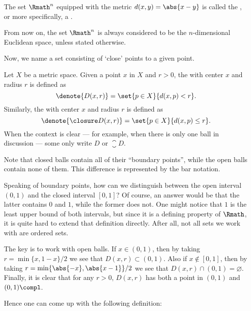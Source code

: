 \begin{definition}
    \label{def:eucspace}
    The set \(\Rmath^n\) equipped with the metric \(d(x,y)=\abs{x-y}\)
    is called the ,
    or more specifically,
    a .
    
    From now on,
    the set \(\Rmath^n\) is always considered to be
    the \(n\)-dimensional Euclidean space,
    unless stated otherwise.
\end{definition}

Now, we name a set consisting of `close' points to a given point.

\begin{definition}[Balls]
    \label{def:ball}
    Let \(X\) be a metric space.
    Given a point \(x\) in \(X\) and \(r>0\),
    the  with center \(x\) and radius \(r\)
    is defined as
    \[
        \denote{D(x,r)}
        =\set{p\in X}{d(x,p)<r}.
    \]
    Similarly,
    the 
    with center \(x\) and radius \(r\)
    is defined as
    \[
        \denote{\closure D(x,r)}
        =\set{p\in X}{d(x,p)\le r}.
    \]
    When the context is clear
    ---
    for example, when there is only one ball in discussion
    ---
    some only write \(D\) or \(\closure D\).
\end{definition}

Note that closed balls contain all of their ``boundary points'',
while the open balls contain none of them.
This difference is represented by the bar notation.

Speaking of boundary points,
how can we distinguish between the open interval \((0,1)\)
and the closed interval \([0,1]\)?
Of course, an answer would be that
the latter contains \(0\) and \(1\),
while the former does not.
One might notice that
\(1\) is the least upper bound of both intervals,
but since it is a defining property of \(\Rmath\),
it is quite hard to extend that definition directly.
After all, not all sets we work with are ordered sets.

The key is to work with open balls.
If \(x\in(0,1)\),
then by taking \(r=\min\{x,1-x\}/2\)
we see that \(D(x,r)\subset(0,1)\).
Also if \(x\notin[0,1]\),
then by taking \(r=\min\{\abs{-x},\abs{x-1}\}/2\)
we see that \(D(x,r)\cap(0,1)=\varnothing\).
Finally, it is clear that for any \(r>0\),
\(D(x,r)\) has both a point in \((0,1)\) and \((0,1)\compl\).

Hence one can come up with the following definition:

